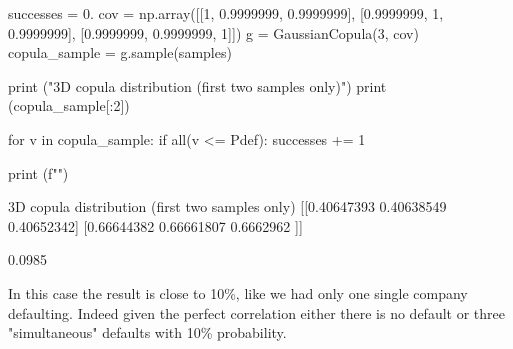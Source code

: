 \begin{ipython}
successes = 0.
cov = np.array([[1, 0.9999999, 0.9999999],
                [0.9999999, 1, 0.9999999],
                [0.9999999, 0.9999999, 1]])
g = GaussianCopula(3, cov)
copula_sample = g.sample(samples)

print ("\n3D copula distribution (first two samples only)")
print (copula_sample[:2])

for v in copula_sample:
    if all(v <= Pdef):
        successes += 1
        
print (f"")
\end{ipython}
\begin{ioutput}
3D copula distribution (first two samples only)
[[0.40647393 0.40638549 0.40652342]
 [0.66644382 0.66661807 0.6662962 ]]

0.0985
\end{ioutput}
In this case the result is close to 10\%, like we had only one single company defaulting. 
Indeed given the perfect correlation either there is no default or three "simultaneous" defaults with 10\% probability.

